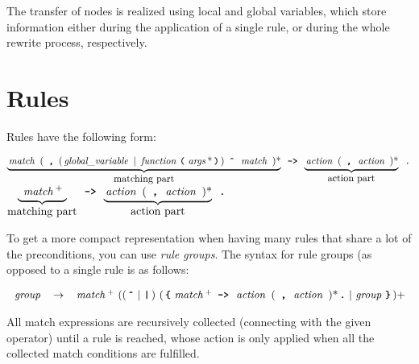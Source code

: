 \documentclass[11pt,a4paper]{article}
\begin{document}
The transfer of nodes is realized using local and global variables, which
store information either during the application of a single rule, or during
the whole rewrite process, respectively.

\section{Rules}

Rules have the following form:

\newcommand{\nt}[1]{\,\mbox{\emph{#1}}\,}
\newcommand{\tok}[1]{\,\mbox{\texttt{\textbf{#1}}}\,}
\newcommand{\id}{\,\mbox{\texttt{ID}}\,}
\newcommand{\BAR}{\,|\,}
\begin{center}

$\underbrace{\mbox{\nt{match} ( \tok{,}
    (\nt{global\_variable} \mbox{\textbar}\ \nt{function}\tok{(}\nt{args}*\tok{)})
    \tok{\^} \nt{match} )*}}_{\mbox{matching part}} \mbox{\ \tok{->}\ }
\underbrace{\mbox{\nt{action} ( \tok{,} \nt{action} )*}}_{\mbox{action
    part}} \mbox{\ \tok{.}}$
\fi
$\underbrace{\rule[-.5ex]{0pt}{1ex}\ \nt{match}^{+}\ }_{\mbox{matching part}} \mbox{\ \tok{->}\ }
\underbrace{\mbox{\nt{action} ( \tok{,} \nt{action} )*}}_{\mbox{action
    part}} \mbox{\ \tok{.}}$
\end{center}

To get a more compact representation when having many rules that share a lot
of the preconditions, you can use \emph{rule groups}. The syntax for rule groups
(as opposed to a single rule is as follows:

\[
\begin{array}{lcl}
\nt{group} & \rightarrow &
   \nt{match}^{+}\ ( (\tok{\^{}} \BAR  \tok{|})\ (\tok{\{}
 \nt{match}^{+}\mbox{\ \tok{->}\ }
    \mbox{\nt{action} ( \tok{,} \nt{action} )*} \tok{.} \BAR \nt{group} \tok{\}})+ \\
\end{array}
\]

All match expressions are recursively collected (connecting with the given
operator) until a rule is reached, whose action is only applied when all the
collected match conditions are fulfilled.
\end{document}
